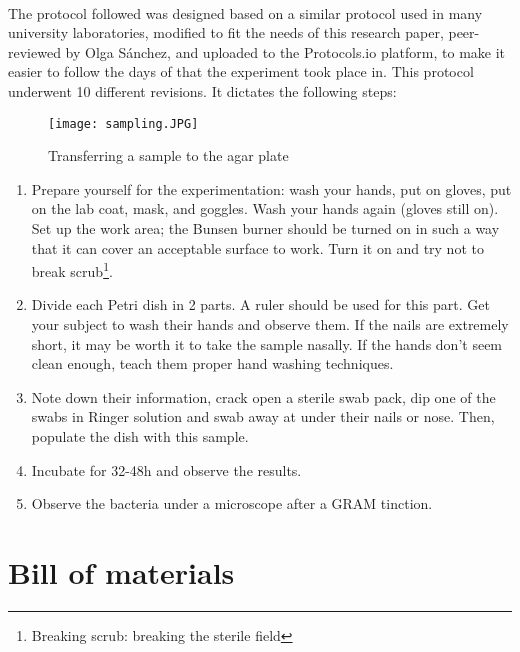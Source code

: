 \paragraph{}The protocol followed was designed based on a similar protocol used in many university laboratories\cite{olearyPracticalHandbookMicrobiology1989}, modified to fit the needs of this research paper, peer-reviewed by Olga Sánchez, and uploaded to the Protocols.io platform, to make it easier to follow the days of that the experiment took place in. This protocol underwent 10 different revisions\cite{rocacugatStaphilococcusAureusSampling2022a}. It dictates the following steps: \newline\begin{wrapfigure}{r}{0.4\textwidth}\begin{center}\texttt{[image: sampling.JPG]}\end{center}\caption{Transferring a sample to the agar plate}\end{wrapfigure}
\begin{enumerate}[label=\arabic*)]
\item Prepare yourself for the experimentation: wash your hands, put on gloves, put on the lab coat, mask, and goggles. Wash your hands again (gloves still on). Set up the work area; the Bunsen burner should be turned on in such a way that it can cover an acceptable surface to work. Turn it on and try not to break scrub\footnote{Breaking scrub: breaking the sterile field}.
\item Divide each Petri dish in 2 parts. A ruler should be used for this part. Get your subject to wash their hands and observe them. If the nails are extremely short, it may be worth it to take the sample nasally. If the hands don't seem clean enough, teach them proper hand washing techniques.
\item Note down their information, crack open a sterile swab pack, dip one of the swabs in Ringer solution and swab away at under their nails or nose. Then, populate the dish with this sample.
\item Incubate for 32-48h and observe the results.
\item Observe the bacteria under a microscope after a GRAM tinction.
\end{enumerate}\newpage
\section{Bill of materials}
